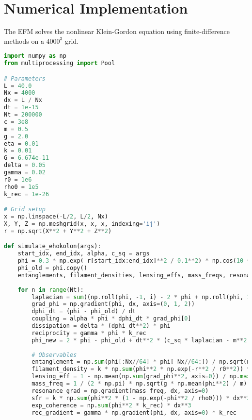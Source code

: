 \documentclass[11pt]{article}
\begin{document}
\section{Numerical Implementation}
The EFM solves the nonlinear Klein-Gordon equation using finite-difference methods on a \(4000^3\) grid.

\begin{lstlisting}[language=Python, caption={Fluxonic Grand Predictions Simulation}, label=lst:simulation]
import numpy as np
from multiprocessing import Pool

# Parameters
L = 40.0
Nx = 4000
dx = L / Nx
dt = 1e-15
Nt = 200000
c = 3e8
m = 0.5
g = 2.0
eta = 0.01
k = 0.01
G = 6.674e-11
delta = 0.05
gamma = 0.02
r0 = 1e6
rho0 = 1e5
k_rec = 1e-26

# Grid setup
x = np.linspace(-L/2, L/2, Nx)
X, Y, Z = np.meshgrid(x, x, x, indexing='ij')
r = np.sqrt(X**2 + Y**2 + Z**2)

def simulate_ehokolon(args):
    start_idx, end_idx, alpha, c_sq = args
    phi = 0.3 * np.exp(-r[start_idx:end_idx]**2 / 0.1**2) * np.cos(10 * X[start_idx:end_idx]) + 0.1 * np.random.rand(Nx//64, Nx, Nx)
    phi_old = phi.copy()
    entanglements, filament_densities, lensing_effs, mass_freqs, resonance_grads, sfrs, exp_coherences, rec_grads = [], [], [], [], [], [], [], []
    
    for n in range(Nt):
        laplacian = sum((np.roll(phi, -1, i) - 2 * phi + np.roll(phi, 1, i)) / dx**2 for i in range(3))
        grad_phi = np.gradient(phi, dx, axis=(0, 1, 2))
        dphi_dt = (phi - phi_old) / dt
        coupling = alpha * phi * dphi_dt * grad_phi[0]
        dissipation = delta * (dphi_dt**2) * phi
        reciprocity = gamma * phi * k_rec
        phi_new = 2 * phi - phi_old + dt**2 * (c_sq * laplacian - m**2 * phi - g * phi**3 - eta * phi**5 + 8 * np.pi * G * k * phi**2 + coupling - dissipation + reciprocity)
        
        # Observables
        entanglement = np.sum(phi[:Nx//64] * phi[-Nx//64:]) / np.sqrt(np.sum(phi[:Nx//64]**2) * np.sum(phi[-Nx//64:]**2))
        filament_density = k * np.sum(phi**2 * np.exp(-r**2 / r0**2)) * dx**3
        lensing_eff = 1 - np.mean(np.sum(grad_phi**2, axis=0)) / np.max(np.sum(grad_phi**2, axis=0))
        mass_freq = 1 / (2 * np.pi) * np.sqrt(g * np.mean(phi**2) / m)
        resonance_grad = np.gradient(mass_freq, dx, axis=0)
        sfr = k * np.sum(phi**2 * (1 - np.exp(-phi**2 / rho0))) * dx**3
        exp_coherence = np.sum(phi**2 * k_rec) * dx**3
        rec_gradient = gamma * np.gradient(phi, dx, axis=0) * k_rec
        

\end{lstlisting}
\end{document}
